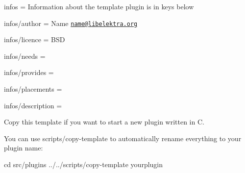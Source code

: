 
\begin{DoxyItemize}
\item infos = Information about the template plugin is in keys below
\item infos/author = Name \href{mailto:name@libelektra.org}{\tt name@libelektra.\+org}
\item infos/licence = B\+S\+D
\item infos/needs =
\item infos/provides =
\item infos/placements =
\item infos/description =
\end{DoxyItemize}

Copy this template if you want to start a new plugin written in C.

You can use scripts/copy-\/template to automatically rename everything to your plugin name\+: \begin{DoxyVerb}    cd src/plugins
    ../../scripts/copy-template yourplugin\end{DoxyVerb}
 